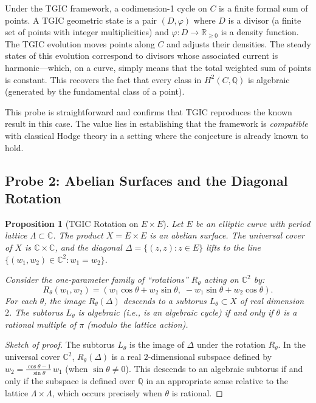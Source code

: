 \documentclass[11pt,a4paper]{article}
\theoremstyle{definition}
\theoremstyle{plain}
\newtheorem{proposition}[theorem]{Proposition}
\newcommand{\QQ}{\mathbb{Q}}
\newcommand{\RR}{\mathbb{R}}
\newcommand{\CC}{\mathbb{C}}
\begin{document}
Under the TGIC framework, a codimension-1 cycle on $C$ is a finite formal sum of points. A TGIC geometric state is a pair $(D, \varphi)$ where $D$ is a divisor (a finite set of points with integer multiplicities) and $\varphi: D \to \RR_{\geq 0}$ is a density function. The TGIC evolution moves points along $C$ and adjusts their densities. The steady states of this evolution correspond to divisors whose associated current is harmonic---which, on a curve, simply means that the total weighted sum of points is constant. This recovers the fact that every class in $H^2(C, \QQ)$ is algebraic (generated by the fundamental class of a point).

This probe is straightforward and confirms that TGIC reproduces the known result in this case. The value lies in establishing that the framework is \emph{compatible} with classical Hodge theory in a setting where the conjecture is already known to hold.

\subsection{Probe 2: Abelian Surfaces and the Diagonal Rotation}

\begin{proposition}[TGIC Rotation on $E \times E$]\label{prop:abelian-rotation}
Let $E$ be an elliptic curve with period lattice $\Lambda \subset \CC$. The product $X = E \times E$ is an abelian surface. The universal cover of $X$ is $\CC \times \CC$, and the diagonal $\Delta = \{(z, z) : z \in E\}$ lifts to the line $\{(w_1, w_2) \in \CC^2 : w_1 = w_2\}$.

Consider the one-parameter family of ``rotations'' $R_\theta$ acting on $\CC^2$ by:
\begin{equation}\label{eq:rotation}
R_\theta(w_1, w_2) = (w_1 \cos\theta + w_2 \sin\theta,\; -w_1 \sin\theta + w_2 \cos\theta).
\end{equation}
For each $\theta$, the image $R_\theta(\Delta)$ descends to a subtorus $L_\theta \subset X$ of real dimension $2$. The subtorus $L_\theta$ is algebraic (i.e., is an algebraic cycle) if and only if $\theta$ is a rational multiple of $\pi$ (modulo the lattice action).
\end{proposition}

\begin{proof}[Sketch of proof]
The subtorus $L_\theta$ is the image of $\Delta$ under the rotation $R_\theta$. In the universal cover $\CC^2$, $R_\theta(\Delta)$ is a real $2$-dimensional subspace defined by $w_2 = \frac{\cos\theta - 1}{\sin\theta}\, w_1$ (when $\sin\theta \neq 0$). This descends to an algebraic subtorus if and only if the subspace is defined over $\QQ$ in an appropriate sense relative to the lattice $\Lambda \times \Lambda$, which occurs precisely when $\theta$ is rational.
\end{proof}
\end{document}
